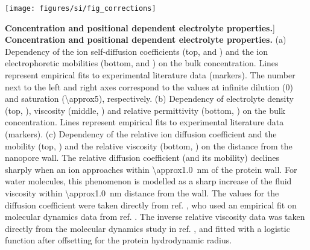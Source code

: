 
\begin{figure*}[!b]

\centering

\texttt{[image: figures/si/fig\_corrections]}

\caption
[\textbf{Concentration and positional dependent electrolyte properties.}]
{
\textbf{Concentration and positional dependent electrolyte properties.}
(a)
Dependency of the ion self-diffusion coefficients (top, \Na\:  and \Cl\:
) and the ion electrophoretic mobilities (bottom, \Na\:
 and \Cl\: ) on the bulk 
concentration. Lines represent empirical fits to experimental literature data (markers). The number next to
the left and right axes correspond to the values at infinite dilution (\SI{0}{\Molar}) and saturation
(\SI{\approx5}{\Molar}),  respectively.
(b)
Dependency of electrolyte density (top, ), viscosity (middle,
) and relative permittivity (bottom, ) on the
bulk  concentration. Lines represent empirical fits to experimental literature data (markers).
(c)
Dependency of the relative ion diffusion coefficient and the mobility (top, ) and
the relative viscosity (bottom, ) on the distance from the nanopore wall. The
relative diffusion coefficient (and its mobility) declines sharply when an ion approaches within
\SI{\approx1.0}{\nm} of the protein wall. For water molecules, this phenomenon is modelled as a sharp increase
of the fluid viscosity within \SI{\approx1.0}{\nm} distance from the wall. The values for the diffusion
coefficient were taken directly from ref. , who used an empirical fit on molecular
dynamics data from ref. . The inverse relative viscosity data was taken directly from
the molecular dynamics study in ref. , and fitted with a logistic function after
offsetting for the protein hydrodynamic radius.
}

\label{fig:corrections}

\end{figure*}
